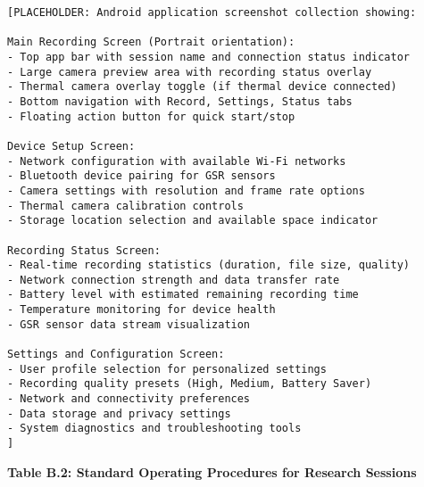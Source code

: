 \documentclass[12pt,a4paper]{article}
\begin{document}
\begin{verbatim}
[PLACEHOLDER: Android application screenshot collection showing:

Main Recording Screen (Portrait orientation):
- Top app bar with session name and connection status indicator
- Large camera preview area with recording status overlay
- Thermal camera overlay toggle (if thermal device connected)
- Bottom navigation with Record, Settings, Status tabs
- Floating action button for quick start/stop

Device Setup Screen:
- Network configuration with available Wi-Fi networks
- Bluetooth device pairing for GSR sensors
- Camera settings with resolution and frame rate options
- Thermal camera calibration controls
- Storage location selection and available space indicator

Recording Status Screen:
- Real-time recording statistics (duration, file size, quality)
- Network connection strength and data transfer rate
- Battery level with estimated remaining recording time
- Temperature monitoring for device health
- GSR sensor data stream visualization

Settings and Configuration Screen:
- User profile selection for personalized settings
- Recording quality presets (High, Medium, Battery Saver)
- Network and connectivity preferences
- Data storage and privacy settings
- System diagnostics and troubleshooting tools
]
\end{verbatim}

\textbf{Table B.2: Standard Operating Procedures for Research Sessions}
\end{document}

